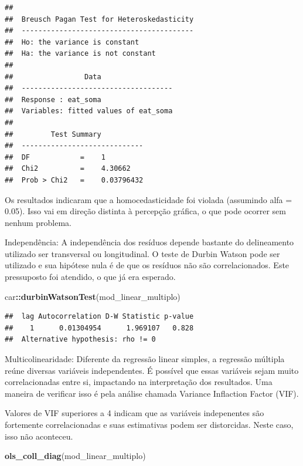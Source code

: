 \documentclass[
]{book}
\newenvironment{Shaded}{\begin{snugshade}}{\end{snugshade}}
\newcommand{\KeywordTok}[1]{\textcolor[rgb]{0.13,0.29,0.53}{\textbf{#1}}}
\newcommand{\NormalTok}[1]{#1}
\newcommand{\OperatorTok}[1]{\textcolor[rgb]{0.81,0.36,0.00}{\textbf{#1}}}
\begin{document}
\begin{verbatim}
## 
##  Breusch Pagan Test for Heteroskedasticity
##  -----------------------------------------
##  Ho: the variance is constant            
##  Ha: the variance is not constant        
## 
##                 Data                 
##  ------------------------------------
##  Response : eat_soma 
##  Variables: fitted values of eat_soma 
## 
##         Test Summary          
##  -----------------------------
##  DF            =    1 
##  Chi2          =    4.30662 
##  Prob > Chi2   =    0.03796432
\end{verbatim}

Os resultados indicaram que a homocedasticidade foi violada (assumindo alfa = 0.05). Isso vai em direção distinta à percepção gráfica, o que pode ocorrer sem nenhum problema.

Independência: A independência dos resíduos depende bastante do delineamento utilizado ser transversal ou longitudinal. O teste de Durbin Watson pode ser utilizado e sua hipótese nula é de que os resíduos não são correlacionados. Este pressuposto foi atendido, o que já era esperado.

\begin{Shaded}
\begin{Highlighting}[]
\NormalTok{car}\OperatorTok{::}\KeywordTok{durbinWatsonTest}\NormalTok{(mod_linear_multiplo)}
\end{Highlighting}
\end{Shaded}

\begin{verbatim}
##  lag Autocorrelation D-W Statistic p-value
##    1      0.01304954      1.969107   0.828
##  Alternative hypothesis: rho != 0
\end{verbatim}

Multicolinearidade: Diferente da regressão linear simples, a regressão múltipla reúne diversas variáveis independentes. É possível que essas variáveis sejam muito correlacionadas entre si, impactando na interpretação dos resultados. Uma maneira de verificar isso é pela análise chamada Variance Inflaction Factor (VIF).

Valores de VIF superiores a 4 indicam que as variáveis indepenentes são fortemente correlacionadas e suas estimativas podem ser distorcidas. Neste caso, isso não aconteceu.

\begin{Shaded}
\begin{Highlighting}[]
\KeywordTok{ols_coll_diag}\NormalTok{(mod_linear_multiplo)}
\end{Highlighting}
\end{Shaded}
\end{document}
